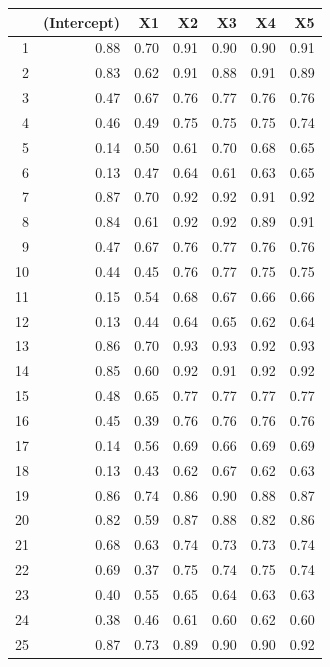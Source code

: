 \documentclass[authoryear, review, 11pt]{elsarticle}
\begin{document}
\begin{table}[ht]
\begin{center}
\begin{tabular}{rrrrrrr}
  \hline
 & (Intercept) & X1 & X2 & X3 & X4 & X5 \\ 
  \hline
1 & 0.88 & 0.70 & 0.91 & 0.90 & 0.90 & 0.91 \\ 
  2 & 0.83 & 0.62 & 0.91 & 0.88 & 0.91 & 0.89 \\ 
  3 & 0.47 & 0.67 & 0.76 & 0.77 & 0.76 & 0.76 \\ 
  4 & 0.46 & 0.49 & 0.75 & 0.75 & 0.75 & 0.74 \\ 
  5 & 0.14 & 0.50 & 0.61 & 0.70 & 0.68 & 0.65 \\ 
  6 & 0.13 & 0.47 & 0.64 & 0.61 & 0.63 & 0.65 \\ 
  7 & 0.87 & 0.70 & 0.92 & 0.92 & 0.91 & 0.92 \\ 
  8 & 0.84 & 0.61 & 0.92 & 0.92 & 0.89 & 0.91 \\ 
  9 & 0.47 & 0.67 & 0.76 & 0.77 & 0.76 & 0.76 \\ 
  10 & 0.44 & 0.45 & 0.76 & 0.77 & 0.75 & 0.75 \\ 
  11 & 0.15 & 0.54 & 0.68 & 0.67 & 0.66 & 0.66 \\ 
  12 & 0.13 & 0.44 & 0.64 & 0.65 & 0.62 & 0.64 \\ 
  13 & 0.86 & 0.70 & 0.93 & 0.93 & 0.92 & 0.93 \\ 
  14 & 0.85 & 0.60 & 0.92 & 0.91 & 0.92 & 0.92 \\ 
  15 & 0.48 & 0.65 & 0.77 & 0.77 & 0.77 & 0.77 \\ 
  16 & 0.45 & 0.39 & 0.76 & 0.76 & 0.76 & 0.76 \\ 
  17 & 0.14 & 0.56 & 0.69 & 0.66 & 0.69 & 0.69 \\ 
  18 & 0.13 & 0.43 & 0.62 & 0.67 & 0.62 & 0.63 \\ 
  19 & 0.86 & 0.74 & 0.86 & 0.90 & 0.88 & 0.87 \\ 
  20 & 0.82 & 0.59 & 0.87 & 0.88 & 0.82 & 0.86 \\ 
  21 & 0.68 & 0.63 & 0.74 & 0.73 & 0.73 & 0.74 \\ 
  22 & 0.69 & 0.37 & 0.75 & 0.74 & 0.75 & 0.74 \\ 
  23 & 0.40 & 0.55 & 0.65 & 0.64 & 0.63 & 0.63 \\ 
  24 & 0.38 & 0.46 & 0.61 & 0.60 & 0.62 & 0.60 \\ 
  25 & 0.87 & 0.73 & 0.89 & 0.90 & 0.90 & 0.92 \\ 

\end{tabular}
\end{center}
\end{table}
\end{document}
